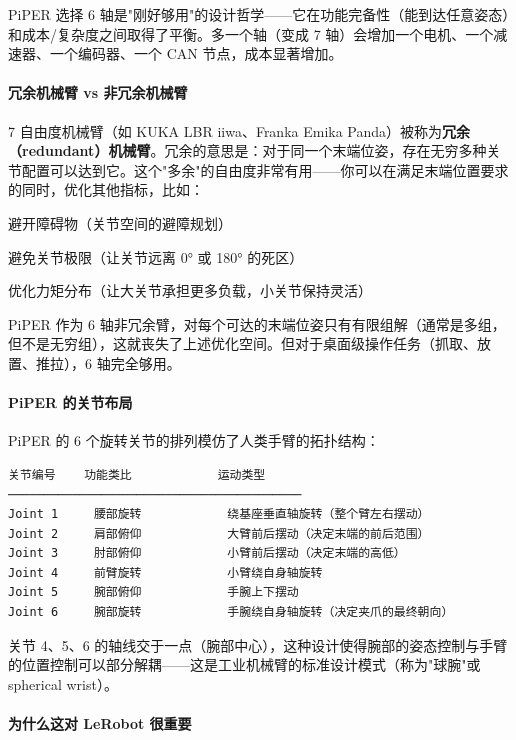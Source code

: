 \documentclass[UTF8,a4paper,11pt]{ctexart}
\begin{document}
PiPER 选择 6 轴是"刚好够用"的设计哲学——它在功能完备性（能到达任意姿态）和成本/复杂度之间取得了平衡。多一个轴（变成 7 轴）会增加一个电机、一个减速器、一个编码器、一个 CAN 节点，成本显著增加。

\paragraph{冗余机械臂 vs 非冗余机械臂}


7 自由度机械臂（如 KUKA LBR iiwa、Franka Emika Panda）被称为\textbf{冗余（redundant）机械臂}。冗余的意思是：对于同一个末端位姿，存在无穷多种关节配置可以达到它。这个"多余"的自由度非常有用——你可以在满足末端位置要求的同时，优化其他指标，比如：

\item 避开障碍物（关节空间的避障规划）
\item 避免关节极限（让关节远离 0° 或 180° 的死区）
\item 优化力矩分布（让大关节承担更多负载，小关节保持灵活）

PiPER 作为 6 轴非冗余臂，对每个可达的末端位姿只有有限组解（通常是多组，但不是无穷组），这就丧失了上述优化空间。但对于桌面级操作任务（抓取、放置、推拉），6 轴完全够用。

\paragraph{PiPER 的关节布局}


PiPER 的 6 个旋转关节的排列模仿了人类手臂的拓扑结构：

\begin{lstlisting}[language=text]
关节编号    功能类比            运动类型
─────────────────────────────────────────
Joint 1     腰部旋转            绕基座垂直轴旋转（整个臂左右摆动）
Joint 2     肩部俯仰            大臂前后摆动（决定末端的前后范围）
Joint 3     肘部俯仰            小臂前后摆动（决定末端的高低）
Joint 4     前臂旋转            小臂绕自身轴旋转
Joint 5     腕部俯仰            手腕上下摆动
Joint 6     腕部旋转            手腕绕自身轴旋转（决定夹爪的最终朝向）
\end{lstlisting}

关节 4、5、6 的轴线交于一点（腕部中心），这种设计使得腕部的姿态控制与手臂的位置控制可以部分解耦——这是工业机械臂的标准设计模式（称为"球腕"或 spherical wrist）。

\paragraph{为什么这对 LeRobot 很重要}
\end{document}
